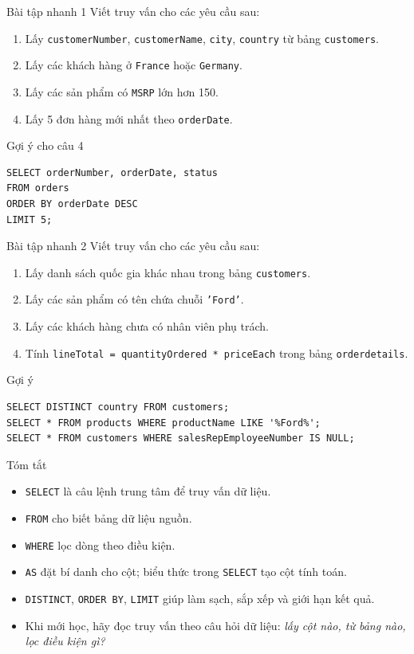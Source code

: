 \documentclass[aspectratio=169,11pt]{beamer}
\newcommand{\kw}[1]{\textcolor{sqlblue}{\texttt{#1}}}
\begin{document}
\begin{frame}[fragile]{Bài tập nhanh 1}
Viết truy vấn cho các yêu cầu sau:
\begin{enumerate}
  \item Lấy \texttt{customerNumber}, \texttt{customerName}, \texttt{city}, \texttt{country} từ bảng \texttt{customers}.
  \item Lấy các khách hàng ở \texttt{France} hoặc \texttt{Germany}.
  \item Lấy các sản phẩm có \texttt{MSRP} lớn hơn 150.
  \item Lấy 5 đơn hàng mới nhất theo \texttt{orderDate}.
\end{enumerate}
\pause
\begin{block}{Gợi ý cho câu 4}
\begin{lstlisting}
SELECT orderNumber, orderDate, status
FROM orders
ORDER BY orderDate DESC
LIMIT 5;
\end{lstlisting}
\end{block}
\end{frame}

\begin{frame}[fragile]{Bài tập nhanh 2}
Viết truy vấn cho các yêu cầu sau:
\begin{enumerate}
  \item Lấy danh sách quốc gia khác nhau trong bảng \texttt{customers}.
  \item Lấy các sản phẩm có tên chứa chuỗi \texttt{'Ford'}.
  \item Lấy các khách hàng chưa có nhân viên phụ trách.
  \item Tính \texttt{lineTotal = quantityOrdered * priceEach} trong bảng \texttt{orderdetails}.
\end{enumerate}
\pause
\begin{block}{Gợi ý}
\begin{lstlisting}
SELECT DISTINCT country FROM customers;
SELECT * FROM products WHERE productName LIKE '%Ford%';
SELECT * FROM customers WHERE salesRepEmployeeNumber IS NULL;
\end{lstlisting}
\end{block}
\end{frame}

\begin{frame}{Tóm tắt}
\begin{itemize}
  \item \kw{SELECT} là câu lệnh trung tâm để truy vấn dữ liệu.
  \item \kw{FROM} cho biết bảng dữ liệu nguồn.
  \item \kw{WHERE} lọc dòng theo điều kiện.
  \item \kw{AS} đặt bí danh cho cột; biểu thức trong \kw{SELECT} tạo cột tính toán.
  \item \kw{DISTINCT}, \kw{ORDER BY}, \kw{LIMIT} giúp làm sạch, sắp xếp và giới hạn kết quả.
  \item Khi mới học, hãy đọc truy vấn theo câu hỏi dữ liệu: \textit{lấy cột nào, từ bảng nào, lọc điều kiện gì?}
\end{itemize}
\end{frame}
\end{document}
